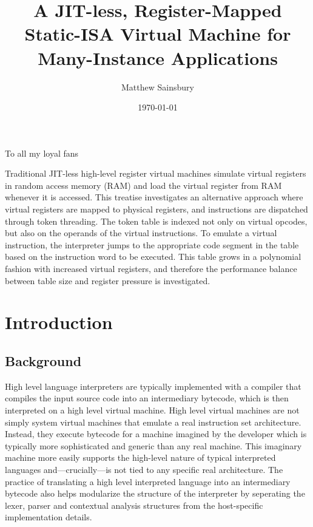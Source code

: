 



\title{A JIT-less, Register-Mapped Static-ISA Virtual Machine for Many-Instance Applications}
\author{Matthew Sainsbury}
\date{\today}

\begin{titlepage}
	\maketitle
\end{titlepage}


	To all my loyal fans

	Traditional JIT-less high-level register virtual machines simulate virtual registers in random access memory (RAM) and load the virtual register from RAM whenever it is accessed. \citep{caseregistervm} This treatise investigates an alternative approach where virtual registers are mapped to physical registers, and instructions are dispatched through token threading. The token table is indexed not only on virtual opcodes, but also on the operands of the virtual instructions. To emulate a virtual instruction, the interpreter jumps to the appropriate code segment in the table based on the instruction word to be executed. This table grows in a polynomial fashion with increased virtual registers, and therefore the performance balance between table size and register pressure is investigated.


\tableofcontents

\chapter{Introduction}
	\startrealnumbers
	
	\section{Background}
		High level language interpreters are typically implemented with a compiler that compiles the input source code into an intermediary bytecode, which is then interpreted on a high level virtual machine. High level virtual machines are not simply system virtual machines that emulate a real instruction set architecture. \citep{smithvmarticle} Instead, they execute bytecode for a machine imagined by the developer which is typically more sophisticated and generic than any real machine. This imaginary machine more easily supports the high-level nature of typical interpreted languages and---crucially---is not tied to any specific real architecture. The practice of translating a high level interpreted language into an intermediary bytecode also helps modularize the structure of the interpreter by seperating the lexer, parser and contextual analysis structures from the host-specific implementation details. \citep{structureinterpreters}
	
